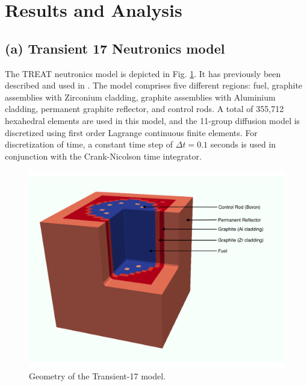 \documentclass{anstrans}
\begin{document}
\section{Results and Analysis}

\subsection{(a) Transient 17 Neutronics model}\label{sec:macro_model}
The TREAT neutronics model is depicted in Fig. \ref{fig:treat_macro}. It has previously been described and used in \cite{DeHart2016}. The model comprises five different regions: fuel, graphite assemblies with Zirconium cladding, graphite assemblies with Aluminium cladding, permanent graphite reflector, and control rods. A total of 355,712 hexahedral elements are used in this model, and the 11-group diffusion model is discretized using first order Lagrange continuous finite elements. For discretization of time, a constant time step of $\Delta t = 0.1$ seconds is used in conjunction with the Crank-Nicolson time integrator.

\begin{figure}[ht] %
  \centering
  \includegraphics[scale=0.35]{./figures/transient-17.pdf}
  \caption{Geometry of the Transient-17 model. \label{fig:treat_macro}}
\end{figure}
\end{document}
